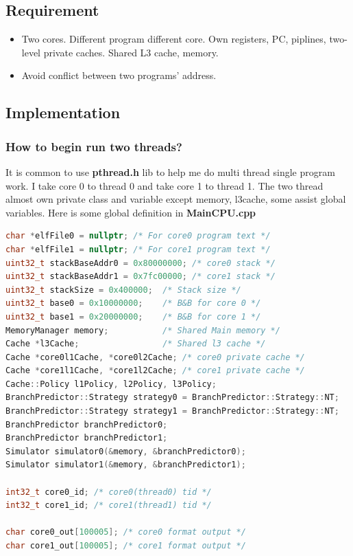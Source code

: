 \mathbb{R} \documentclass{article}
\begin{document}
\subsection{Requirement}
\begin{itemize}
  \item Two cores. Different program different core. Own registers, PC, piplines, two-level private caches. Shared L3 cache, memory. 
  \item Avoid conflict between two programs' address.
\end{itemize} 
\subsection{Implementation}
\subsubsection{How to begin run two threads?}
It is common to use \textbf{pthread.h} lib to help me do multi thread single program work. I take core 0 to thread 0 and take core 1 to thread 1. The two thread almost own private class and variable except memory, l3cache, some assist global variables. Here is some global definition in \textbf{MainCPU.cpp}
\begin{lstlisting}[language=c++]
char *elfFile0 = nullptr; /* For core0 program text */
char *elfFile1 = nullptr; /* For core1 program text */
uint32_t stackBaseAddr0 = 0x80000000; /* core0 stack */
uint32_t stackBaseAddr1 = 0x7fc00000; /* core1 stack */
uint32_t stackSize = 0x400000;  /* Stack size */
uint32_t base0 = 0x10000000;    /* B&B for core 0 */
uint32_t base1 = 0x20000000;    /* B&B for core 1 */
MemoryManager memory;           /* Shared Main memory */
Cache *l3Cache;                 /* Shared l3 cache */
Cache *core0l1Cache, *core0l2Cache; /* core0 private cache */
Cache *core1l1Cache, *core1l2Cache; /* core1 private cache */
Cache::Policy l1Policy, l2Policy, l3Policy;
BranchPredictor::Strategy strategy0 = BranchPredictor::Strategy::NT;
BranchPredictor::Strategy strategy1 = BranchPredictor::Strategy::NT;
BranchPredictor branchPredictor0;
BranchPredictor branchPredictor1;
Simulator simulator0(&memory, &branchPredictor0);
Simulator simulator1(&memory, &branchPredictor1);
  
int32_t core0_id; /* core0(thread0) tid */
int32_t core1_id; /* core1(thread1) tid */
  
char core0_out[100005]; /* core0 format output */
char core1_out[100005]; /* core1 format output */  
\end{lstlisting}
\end{document}
